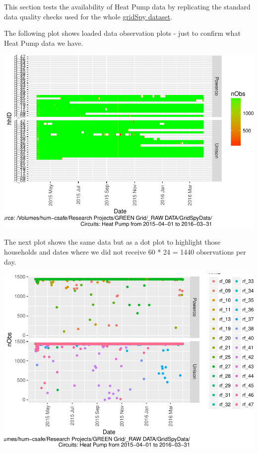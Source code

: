 \documentclass[]{article}
\begin{document}
This section tests the availability of Heat Pump data by replicating the
standard data quality checks used for the whole
\href{https://git.soton.ac.uk/ba1e12/nzGREENGrid/tree/master/dataProcessing/gridSpy}{gridSpy
dataset}.

The following plot shows loaded data observation plots - just to confirm
what Heat Pump data we have.

\includegraphics{nzGGHouseholdPowerDemandProfile_Heat Pump_2015-04-01_2016-03-31_files/figure-latex/loadedFilesObs Tile Plot-1.pdf}

The next plot shows the same data but as a dot plot to highlight those
households and dates where we did not receive 60 * 24 = 1440
observations per day.

\includegraphics{nzGGHouseholdPowerDemandProfile_Heat Pump_2015-04-01_2016-03-31_files/figure-latex/loadedFilesObs point plot-1.pdf}
\end{document}
